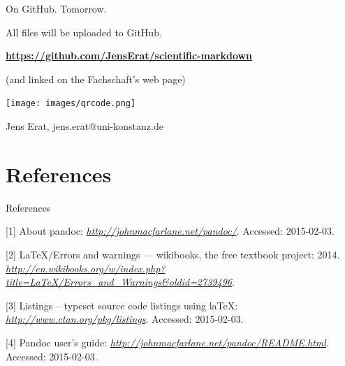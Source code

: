 \documentclass[smaller,ignorenonframetext,]{beamer}
\makeatletter
\def\maxwidth{\ifdim\Gin@nat@width>\linewidth\linewidth\else\Gin@nat@width\fi}
\def\maxheight{\ifdim\Gin@nat@height>\textheight0.8\textheight\else\Gin@nat@height\fi}
\def\maxwidth{\ifdim\Gin@nat@width>\linewidth\linewidth\else0.65\Gin@nat@width\fi}
\def\maxheight{\ifdim\Gin@nat@height>0.65\textheight 0.65\textheight\else0.65\Gin@nat@height\fi}
\renewcommand{\includegraphics}[2][]{%
    \OOldincludegraphics[#1,width=\maxwidth,height=\maxheight,keepaspectratio]{#2}}
\makeatother
\begin{document}
\begin{frame}{On GitHub. Tomorrow.}

All files will be uploaded to GitHub.

\textbf{\large\url{https://github.com/JensErat/scientific-markdown}}

(and linked on the Fachschaft's web page)

\texttt{[image: images/qrcode.png]}~

Jens Erat, jens.erat@uni-konstanz.de

\end{frame}

\section{References}\label{references-1}

\begin{frame}{References}

{[}1{]} About pandoc: \emph{\url{http://johnmacfarlane.net/pandoc/}}.
Accessed: 2015-02-03.

{[}2{]} LaTeX/Errors and warnings --- wikibooks, the free textbook
project: 2014.
\emph{\url{http://en.wikibooks.org/w/index.php?title=LaTeX/Errors_and_Warnings\&oldid=2739496}}.

{[}3{]} Listings -- typeset source code listings using laTeX:
\emph{\url{http://www.ctan.org/pkg/listings}}. Accessed: 2015-02-03.

{[}4{]} Pandoc user's guide:
\emph{\url{http://johnmacfarlane.net/pandoc/README.html}}. Accessed:
2015-02-03.

\end{frame}
\end{document}
